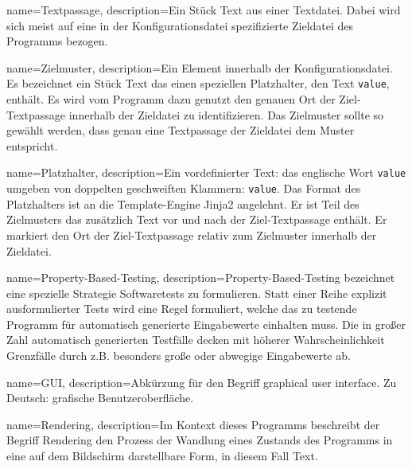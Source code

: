 \makeglossaries

{
    name=Textpassage,
    description={Ein Stück Text aus einer Textdatei. Dabei
            wird sich meist auf eine in der Konfigurationsdatei spezifizierte
            Zieldatei des Programms bezogen.}
}

{
    name=Zielmuster,
    description={Ein Element innerhalb der Konfigurationsdatei. Es bezeichnet ein
            Stück Text das einen speziellen \gls{Platzhalter}, den Text \texttt{{{value}}},
            enthält. Es wird vom Programm dazu genutzt den genauen Ort der Ziel-\gls{Textpassage}
            innerhalb der Zieldatei zu identifizieren. Das Zielmuster sollte so gewählt
            werden, dass genau eine Textpassage der Zieldatei dem Muster entspricht.}
}

{
    name=Platzhalter,
    description={Ein vordefinierter Text: das englische Wort \texttt{value}
            umgeben von doppelten geschweiften Klammern:
            \texttt{{{value}}}. Das Format des Platzhalters ist an
            die Template-Engine Jinja2 \cite{jinja2} angelehnt.
            Er ist Teil des \gls{Zielmuster}s das zusätzlich Text vor und nach
            der Ziel-\gls{Textpassage} enthält. Er markiert den Ort der Ziel-\gls{Textpassage}
            relativ zum \gls{Zielmuster} innerhalb der Zieldatei.}
}

{
    name=Property-Based-Testing,
    description={Property-Based-Testing bezeichnet eine spezielle Strategie Softwaretests
            zu formulieren. Statt einer Reihe explizit ausformulierter Tests wird eine Regel
            formuliert, welche das zu testende Programm für automatisch generierte Eingabewerte
            einhalten muss. Die in großer Zahl automatisch generierten Testfälle
            decken mit höherer Wahrscheinlichkeit Grenzfälle durch z.B. besonders
            große oder abwegige Eingabewerte ab.}
}

{
    name=GUI,
    description={Abkürzung für den Begriff graphical user interface. Zu Deutsch:
            grafische Benutzeroberfläche.}
}

{
    name=Rendering,
    description={Im Kontext dieses Programms beschreibt der Begriff Rendering den
            Prozess der Wandlung eines Zustands des Programms in eine auf dem Bildschirm
            darstellbare Form, in diesem Fall Text.}
}

